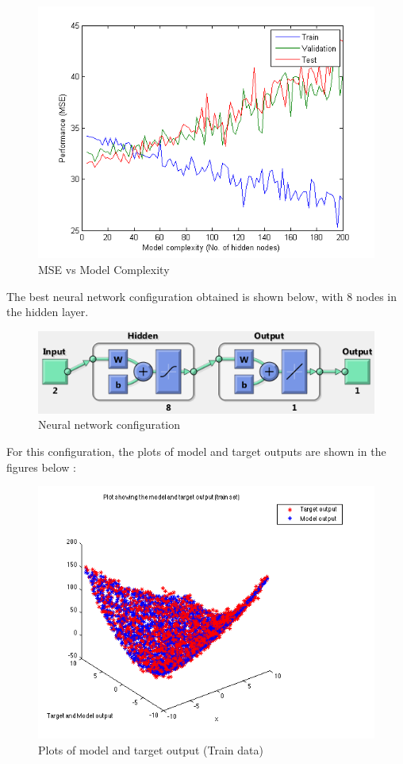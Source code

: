 \documentclass{article}
\begin{document}
\begin{figure}[H]
\centering
\includegraphics[width=0.8\linewidth]{Regression/bivariate/1layer_mse.png}
\caption{MSE vs Model Complexity}
\end{figure}

The best neural network configuration obtained is shown below, with 8 nodes in the hidden layer.

\begin{figure}[H]
\centering
\includegraphics[width=\linewidth]{Regression/bivariate/net_config.png}
\caption{Neural network configuration}
\end{figure}

For this configuration, the plots of model and target outputs are shown in the figures below : 

\begin{figure}[H]
\centering
\includegraphics[width=0.5\linewidth]{Regression/bivariate/output_1layer_train.png}
\caption{Plots of model and target output (Train data)}
\end{figure}
\end{document}
